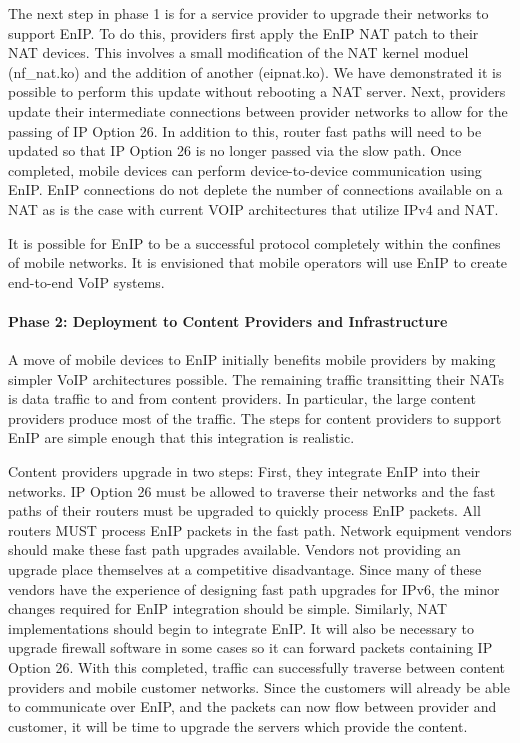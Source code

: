 The next step in phase 1 is for a service provider to upgrade their networks
to support EnIP.  To do this, providers first apply the EnIP NAT
patch to their NAT devices.  This involves a small modification
of the NAT kernel moduel (nf\_nat.ko) and the addition of another (eipnat.ko). 
We have demonstrated it is possible to perform this update without rebooting a
NAT server.  Next, providers update
their intermediate connections between provider networks to allow
for the passing of IP Option 26.  In addition to this, router fast paths will 
need to be updated so that IP Option 26 is no longer passed via the slow path.
Once completed, mobile devices can
perform device-to-device communication using EnIP.  EnIP connections
do not deplete the number of connections available on a NAT as
is the case with current VOIP architectures that utilize IPv4 and NAT.

It is possible for EnIP to be a successful protocol completely within the 
confines of mobile networks.  It is envisioned that mobile operators will use
EnIP to create end-to-end VoIP systems.

\paragraph{Phase 2: Deployment to Content Providers and Infrastructure}
A move of mobile devices to EnIP initially benefits mobile
providers by making simpler VoIP architectures possible.  The remaining traffic
transitting their NATs is data traffic to and from content providers.  In particular,
the large content providers produce most of the traffic.
The steps for content providers to support
EnIP are simple enough that this integration is realistic.

Content providers upgrade in two steps:  First, they integrate EnIP
into their networks.  IP Option 26 must be allowed to traverse
their networks and the fast paths of their routers must be upgraded to
quickly process EnIP packets.
All routers MUST process EnIP packets in the fast path.
Network equipment vendors should make these fast path upgrades available.  
Vendors not providing an upgrade place themselves at a competitive disadvantage.
Since many of these vendors have the experience of designing fast path
upgrades for IPv6, the minor changes required for EnIP integration should be simple.
Similarly, NAT implementations should begin to integrate EnIP.  It will also be 
necessary to upgrade firewall software in some cases so it can forward packets 
containing IP Option 26.  With this completed,
traffic can successfully traverse between content providers and
mobile customer networks.  Since the customers will already be
able to communicate over EnIP, and the packets can now flow between
provider and customer, it will be time to upgrade the servers which
provide the content.

